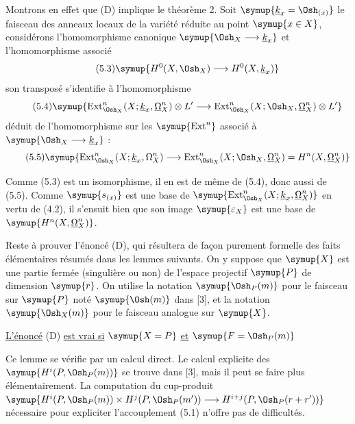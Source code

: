 Montrons en effet que (D) implique le théorème 2. Soit
$\symup{\underline{k}_x=\Osh_{(x)}}$ le faisceau des anneaux locaux de la variété réduite au point
$\symup{x\in X}$, considérons l'homomorphisme canonique
$\symup{\Osh_X\longrightarrow \underline{k}_x}$ et l'homomorphisme associé
\begin{equation}\tag{5.3}
  \symup{H^{0}(X,\Osh_X)\longrightarrow H^{0}(X,\underline{k}_x)}
\end{equation}
son transposé s'identifie à l'homomorphisme
\begin{equation}\tag{5.4}
  \symup{\operatorname{Ext}_{\Osh_X}^{n}(X;\underline{k}_x,\underline{\Omega}_X^{n})\otimes L'
  \longrightarrow
  \operatorname{Ext}_{\Osh_X}^{n}(X;\Osh_X,\underline{\Omega}_X^{n})\otimes L'}
\end{equation}
déduit de l'homomorphisme sur les $\symup{\operatorname{Ext}^{n}}$ associé à
$\symup{\Osh_X\longrightarrow \underline{k}_x}$ :
\begin{equation}\tag{5.5}
  \symup{\operatorname{Ext}_{\Osh_X}^{n}(X;\underline{k}_x,\Omega_X^{n})
  \longrightarrow
  \operatorname{Ext}_{\Osh_X}^{n}(X;\Osh_X,\underline{\Omega}_X^{n})
  =H^{n}(X,\underline{\Omega}_X^{n})}
\end{equation}

Comme (5.3) est un isomorphisme, il en est de même
de (5.4), donc aussi de (5.5). Comme $\symup{s_{(x)}}$ est une base de
$\symup{\operatorname{Ext}_{\Osh_X}^{n}(X;\underline{k}_x,\underline{\Omega}_X^{n})}$ en vertu de (4.2), il
s'ensuit bien que son image $\symup{\varepsilon_X}$ est une base de
$\symup{H^{n}(X,\underline{\Omega}_X^{n})}$.

Reste à prouver l'énoncé (D), qui résultera de façon purement formelle des faits
élémentaires résumés dans les lemmes suivants. On y suppose que $\symup{X}$ est une
partie fermée (singulière ou non) de l'espace projectif $\symup{P}$ de dimension $\symup{r}$.
On utilise la notation $\symup{\Osh_P(m)}$ pour le faisceau sur $\symup{P}$ noté $\symup{\Osh(m)}$ dans
[3], et la notation $\symup{\Osh_X(m)}$ pour le faisceau analogue sur $\symup{X}$.

 \uline{L'énoncé} (D) \uline{est vrai si} $\symup{X=P}$ \uline{et} $\symup{F=\Osh_P(m)}$

Ce lemme se vérifie par un calcul direct. Le calcul explicite des
$\symup{H^{i}(P,\Osh_P(m))}$ se trouve dans [3], mais il peut se faire plus
élémentairement. La computation du cup-produit $\symup{H^{i}(P,\Osh_P(m))\times H^{j}(P,\Osh_P(m'))\longrightarrow H^{i+j}(P,\Osh_P(r+r'))}$ nécessaire pour expliciter l'accouplement (5.1) n'offre pas de
difficultés.

